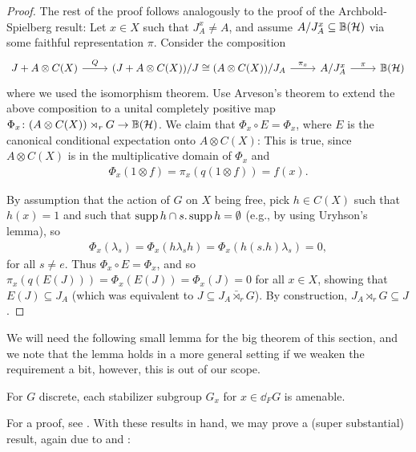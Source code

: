 \begin{proof}
	The rest of the proof follows analogously to the proof of the Archbold-Spielberg result: Let $x \in X$ such that $J_A^x \neq A$, and assume $A/J_A^x \subseteq \mathbb{B}(\mathcal{H})$ via some faithful representation $\pi$. Consider the composition
	\begin{equation}
		\begin{tikzcd}
			J + A \otimes C(X) \ar[r, "Q"] & (J+ A \otimes C(X))/J \cong  (A \otimes C(X))/J_A \ar[r, "\pi_x"] & A/J_A^x \ar[r, "\pi"] &\mathbb{B}(\H)
		\end{tikzcd}
	\end{equation}
	where we used the isomorphism theorem. Use Arveson's theorem to extend the above composition to a unital completely positive map $\Phi_x \colon (A \otimes C(X)) \rtimes_r G \to \mathbb{B}(\mathcal{H})$. We claim that $\Phi_x \circ E = \Phi_x$, where $E$ is the canonical conditional expectation onto $A \otimes C(X)$: This is true, since $A \otimes C(X)$ is in the multiplicative domain of $\Phi_x$ and 
	\begin{align*}
		\Phi_x(1 \otimes f) = \pi_x(q(1 \otimes f)) = f(x).
	\end{align*}
	
	By assumption that the action of $G$ on $X$ being free, pick $h \in C(X)$ such that $h(x) = 1$ and such that $\operatorname{supp} h \cap s. \operatorname{supp} h  = \emptyset$ (e.g., by using Uryhson's lemma), so
	\begin{align*}
	\Phi_x( \lambda_s) = \Phi_x ( h \lambda_s h ) = \Phi_x (h (s.h) \lambda_s) = 0,		
	\end{align*}
	for all $s \neq e$. Thus $\Phi_x \circ E = \Phi_x$, and so $\pi_x(q(E(J))) = \Phi_x(E(J)) = \Phi_x(J) = 0$ for all $x \in X$, showing that $E(J) \subseteq J_A$ (which was equivalent to $J \subseteq J_A \bar \rtimes_r G$). By construction, $J_A \rtimes_r G \subseteq J$.	
\end{proof}
We will need the following small lemma for the big theorem of this section, and we note that the lemma holds in a more general setting if we weaken the requirement a bit, however, this is out of our scope.
\begin{lemma}
	For $G$ discrete, each stabilizer subgroup $G_x$ for $x \in \dd_F G$ is amenable.
	\label{stabfurstamen}
\end{lemma}
For a proof, see \cite[lemma 11]{ozawa2014lecture}. With these results in hand, we may prove a (super substantial) result, again due to \cite{breuillard2017c} and \cite{kalantar2017boundaries}:
